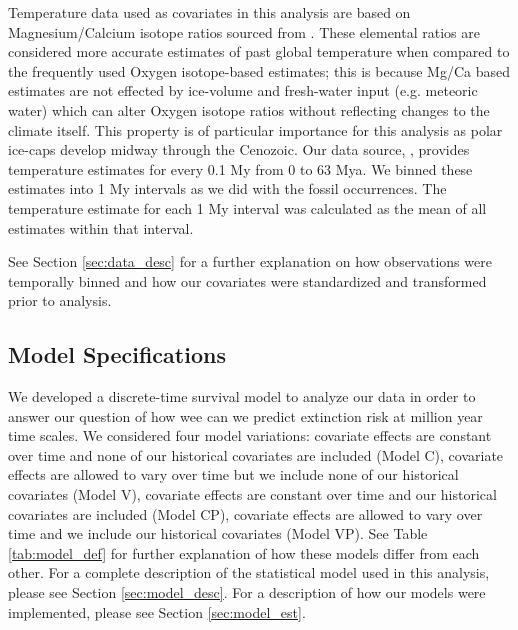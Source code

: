 \documentclass[12pt,letterpaper]{article}
\begin{document}
\begin{refsection}
Temperature data used as covariates in this analysis are based on Magnesium/Calcium isotope ratios sourced from \citet{Cramer2011}. These elemental ratios are considered more accurate estimates of past global temperature when compared to the frequently used Oxygen isotope-based estimates; this is because Mg/Ca based estimates are not effected by ice-volume and fresh-water input (e.g. meteoric water) which can alter Oxygen isotope ratios without reflecting changes to the climate itself. This property is of particular importance for this analysis as polar ice-caps develop midway through the Cenozoic. Our data source, \citet{Cramer2011}, provides temperature estimates for every 0.1 My from 0 to 63 Mya. We binned these estimates into 1 My intervals as we did with the fossil occurrences. The temperature estimate for each 1 My interval was calculated as the mean of all estimates within that interval. 

See Section \ref{sec:data_desc} for a further explanation on how observations were temporally binned and how our covariates were standardized and transformed prior to analysis.




\subsection{Model Specifications}

We developed a discrete-time survival model to analyze our data in order to answer our question of how wee can we predict extinction risk at million year time scales. We considered four model variations: covariate effects are constant over time and none of our historical covariates are included (Model C), covariate effects are allowed to vary over time but we include none of our historical covariates (Model V), covariate effects are constant over time and our historical covariates are included (Model CP), covariate effects are allowed to vary over time and we include our historical covariates (Model VP). See Table \ref{tab:model_def} for further explanation of how these models differ from each other. For a complete description of the statistical model used in this analysis, please see Section \ref{sec:model_desc}. For a description of how our models were implemented, please see Section \ref{sec:model_est}.


\end{refsection}
\end{document}
